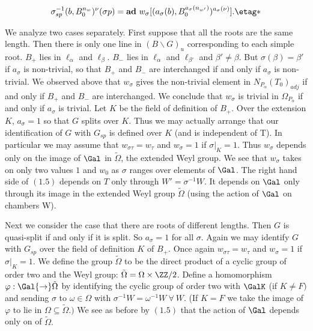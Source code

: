 \documentclass{memo-l}
\theoremstyle{definition}
\theoremstyle{remark}
\numberwithin{section}{chapter}
\numberwithin{equation}{chapter}
\begin{document}
$$
{\sigma}_{sp}^{-1}(b,B_{0}^{n_{w}})^{{\nu}} ({\sigma}p)  = 
{\bold {ad}}\ 
w_{{\sigma}}[(a_{{\sigma}}(b),B_{0}^{a_{{\sigma}}(n_{w'})})^{a_{{\sigma}}({\nu})}]. \etag *
$$
\enddefinition

   We analyze two cases separately.  First suppose that all the roots are
the same length.  Then there is only one line in $(B\backslash G)_{u}$
corresponding to each simple root.  $B_{+}$ lies in ${\ell}_{{\alpha}}$ and
${\ell}_{{\beta}}$.  $B_{-}$ lies in ${\ell}_{{\alpha}}$ and
${\ell}_{{\beta}'}$ and ${\beta}'  \ne {\beta}$.  But
${\sigma}({\beta}) = {\beta}'$ if $a_{{\sigma}}$ is non-trivial, so that
$B_{+}$ and $B_{-}$ are interchanged if and only if $a_{{\sigma}}$ is
non-trivial.  We observed above that $w_{{\sigma}}$ gives the non-trivial
element in ${N}_{P_\alpha} (T_{0})_{adj}$ if and only if $B_{+}$ and $B_{-}$
are interchanged.  We conclude that $w_{{\sigma}}$ is trivial in
${\Omega}_{P_\alpha}$ if and only if $a_{{\sigma}}$ is trivial.  Let $K$ be
the field of definition of $B_{+}$.  Over the extension $K$, $a_{{\sigma}} = 1$
so that $G$ splits over $K$.  Thus we may actually arrange that our
identification of $G$ with $G_{sp}$ is defined over $K$ (and is independent
of T).  In particular we may assume that $w_{{\sigma}{\tau}} = w_{{\tau}}$
and $w_{{\sigma}} = 1$ if ${\sigma}\vert _{K}  =  1$.  Thus $w_{{\sigma}}$
depends only on the image of $\Gal$ in $\tilde {\Omega}$, the extended
Weyl group. We see
that $w_{{\sigma}}$ takes on only two values $1$ and $w_{0}$ as ${\sigma}$
ranges over elements of $\Gal$.  The right hand side of $(1.5)$
depends on $T$ only through $W'  =  {\sigma}^{-1}W$.  It depends on $\Gal$ 
only through its image in the extended Weyl group $\tilde {\Omega}$
(using the action of $\Gal$ on chambers W).

   Next we consider the case that there are roots of different lengths.
Then $G$ is quasi-split if and only if it is split.  So $a_{{\sigma}} = 1$
for all ${\sigma}$.  Again we may identify $G$ with $G_{sp}$ over the field
of definition $K$ of $B_{+}$.  Once again $w_{{\sigma}{\tau}} = w_{{\tau}}$
and $w_{{\sigma}} = 1$ if ${\sigma}\vert _{K}  =  1$.  We define the group
$\tilde {\Omega}$ to be the direct product of a cyclic group of order two
and the Weyl group: $\tilde {\Omega}  =  {\Omega} \times {\ZZ}/2$.
Define a homomorphism ${\varphi}: \Gal {\to} \tilde{\Omega}$ by
identifying the cyclic group of order two with $\GalK$ (if $K  \ne F)$ and
sending ${\sigma}$ to ${\omega}  \in  {\Omega}$ with ${\sigma}^{-1}W  = 
{\omega}^{-1}W {\ \forall\ } W$.  (If $K = F$ we take the image of
${\varphi}$ to lie in ${\Omega} {\subseteq} \tilde{\Omega} .)$ We see as
before by $(1.5)$ that the action of $\Gal$ depends only on
of $\tilde{\Omega} .$
\end{document}
